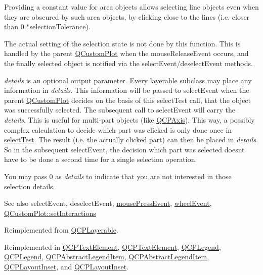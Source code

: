 Providing a constant value for area objects allows selecting line objects even when they are obscured by such area objects, by clicking close to the lines (i.\+e. closer than 0.$\ast$selection\+Tolerance).

The actual setting of the selection state is not done by this function. This is handled by the parent \hyperlink{class_q_custom_plot}{Q\+Custom\+Plot} when the mouse\+Release\+Event occurs, and the finally selected object is notified via the select\+Event/deselect\+Event methods.

{\itshape details} is an optional output parameter. Every layerable subclass may place any information in {\itshape details}. This information will be passed to select\+Event when the parent \hyperlink{class_q_custom_plot}{Q\+Custom\+Plot} decides on the basis of this select\+Test call, that the object was successfully selected. The subsequent call to select\+Event will carry the {\itshape details}. This is useful for multi-\/part objects (like \hyperlink{class_q_c_p_axis}{Q\+C\+P\+Axis}). This way, a possibly complex calculation to decide which part was clicked is only done once in \hyperlink{class_q_c_p_layout_element_ae97f483cccedadbf18ea4525ef240ee4}{select\+Test}. The result (i.\+e. the actually clicked part) can then be placed in {\itshape details}. So in the subsequent select\+Event, the decision which part was selected doesn\textquotesingle{}t have to be done a second time for a single selection operation.

You may pass 0 as {\itshape details} to indicate that you are not interested in those selection details.

\begin{DoxySeeAlso}{See also}
select\+Event, deselect\+Event, \hyperlink{class_q_c_p_layerable_af6567604818db90f4fd52822f8bc8376}{mouse\+Press\+Event}, \hyperlink{class_q_c_p_layerable_a47dfd7b8fd99c08ca54e09c362b6f022}{wheel\+Event}, \hyperlink{class_q_custom_plot_a5ee1e2f6ae27419deca53e75907c27e5}{Q\+Custom\+Plot\+::set\+Interactions} 
\end{DoxySeeAlso}


Reimplemented from \hyperlink{class_q_c_p_layerable_a4001c4d0dfec55598efa4d531f2179a9}{Q\+C\+P\+Layerable}.



Reimplemented in \hyperlink{class_q_c_p_text_element_a1e721bc2994a127ef5a8f0a514a5dbac}{Q\+C\+P\+Text\+Element}, \hyperlink{class_q_c_p_text_element_a29d2998b50ef369d88ca990b9d3542b3}{Q\+C\+P\+Text\+Element}, \hyperlink{class_q_c_p_legend_aa53507624491908fb3d1a514b1fc674e}{Q\+C\+P\+Legend}, \hyperlink{class_q_c_p_legend_a9dc868bd95069fad9f40718b7715e100}{Q\+C\+P\+Legend}, \hyperlink{class_q_c_p_abstract_legend_item_a80ec112a6608fc39dbed56239849b187}{Q\+C\+P\+Abstract\+Legend\+Item}, \hyperlink{class_q_c_p_abstract_legend_item_a8ca19faad8e2062e945772289a9151bd}{Q\+C\+P\+Abstract\+Legend\+Item}, \hyperlink{class_q_c_p_layout_inset_a2eeef7ea1b8340e7c7c2e2fc229df5ea}{Q\+C\+P\+Layout\+Inset}, and \hyperlink{class_q_c_p_layout_inset_a4bd96dd77545a2b407d24c8bdc276927}{Q\+C\+P\+Layout\+Inset}.

